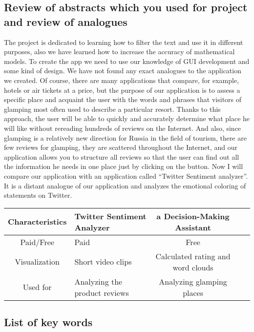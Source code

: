 \documentclass[]{article}
\begin{document}
\subsection{Review of abstracts which you used for project and review of analogues}

The project is dedicated to learning how to filter the text and use it in different purposes, also we have learned how to increase the accuracy of mathematical models. To create the app we need to use our knowledge of GUI development and some kind of design. We have not found any exact analogues to the application we created. Of course, there are many applications that compare, for example, hotels or air tickets at a price, but the purpose of our application is to assess a specific place and acquaint the user with the words and phrases that visitors of glamping most often used to describe a particular resort. Thanks to this approach, the user will be able to quickly and accurately determine what place he will like without rereading hundreds of reviews on the Internet. And also, since glamping is a relatively new direction for Russia in the field of tourism, there are few reviews for glamping, they are scattered throughout the Internet, and our application allows you to structure all reviews so that the user can find out all the information he needs in one place just by clicking on the button.
Now I will compare our application with an application called ``Twitter Sentiment analyzer''. It is a distant analogue of our application and analyzes the emotional coloring of statements on Twitter. 

\vspace{5mm}

\begin{tabularx}{335pt}{|c|X|c|X|c|}

\hline
\textbf{Characteristics} & \textbf{Twitter Sentiment Analyzer} & \textbf{a Decision-Making Assistant}\\\hline

Paid/Free & Paid & Free\\\hline

Visualization & Short video clips & Calculated rating and word clouds\\\hline

Used for & Analyzing the product reviews & Analyzing glamping places\\\hline
\end{tabularx}

\subsection{List of key words}
\end{document}
